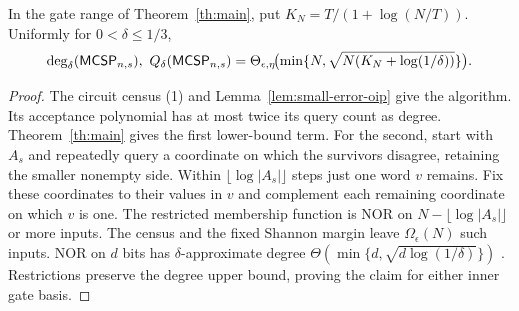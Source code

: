 \begin{theorem}\label{th:small-error}
In the gate range of Theorem~\ref{th:main}, put $K_N=T/(1+\log(N/T))$. Uniformly for $0<\delta\le1/3$,
\[
 \deg_\delta(\mc_{n,s}),\ Q_\delta(\mc_{n,s})
      =\Theta_{\epsilon,\eta}\!\bigl(\min\{N,\sqrt{N(K_N+\log(1/\delta))}\}\bigr).
\]
\end{theorem}
\begin{proof}
The circuit census (1) and Lemma~\ref{lem:small-error-oip} give the algorithm. Its acceptance polynomial has at most twice its query count as degree. Theorem~\ref{th:main} gives the first lower-bound term. For the second, start with $A_s$ and repeatedly query a coordinate on which the survivors disagree, retaining the smaller nonempty side. Within $\lfloor\log|A_s|\rfloor$ steps just one word $v$ remains. Fix these coordinates to their values in $v$ and complement each remaining coordinate on which $v$ is one. The restricted membership function is NOR on $N-\lfloor\log|A_s|\rfloor$ or more inputs. The census and the fixed Shannon margin leave $\Omega_\epsilon(N)$ such inputs. NOR on $d$ bits has $\delta$-approximate degree $\Theta(\min\{d,\sqrt{d\log(1/\delta)}\})$ \cite{dw}. Restrictions preserve the degree upper bound, proving the claim for either inner gate basis.
\end{proof}
